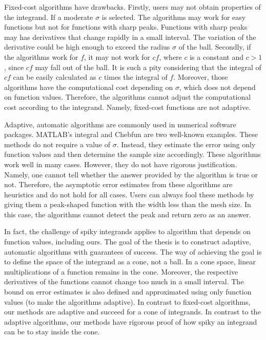 \documentclass{iitthesis}
\theoremstyle{definition}
\theoremstyle{remark}
\begin{document}
Fixed-cost algorithms have drawbacks. Firstly, users may not obtain properties of the integrand. If a moderate $\sigma$ is selected. The algorithms may work for easy functions but not for functions with sharp peaks. Functions with sharp peaks may has derivatives that change rapidly in a small interval. The variation of the derivative could be high enough to exceed the radius $\sigma$ of the ball. Secondly, if the algorithms work for $f$, it may not work for $cf$, where $c$ is a constant and $c>1$, since $cf$ may fall out of the ball. It is such a pity considering that the integral of $cf$ can be easily calculated as $c$ times the integral of $f$. Moreover, those algorithms have the computational cost depending on $\sigma$, which does not depend on function values. Therefore, the algorithms cannot adjust the computational cost according to the integrand. Namely, fixed-cost functions are not adaptive.

\label{secada}

Adaptive, automatic algorithms are commonly used in numerical software packages. MATLAB's integral and Chebfun are two well-known examples. These methods do not require a value of $\sigma$. Instead, they estimate the error using only function values and then determine the sample size accordingly. These algorithms work well in many cases. However, they do not have rigorous justification. Namely, one cannot tell whether the answer provided by the algorithm is true or not. Therefore, the asymptotic error estimates from these algorithms are heuristics and do not hold for all cases. Users can always fool these methods by giving them a peak-shaped function with the width less than the mesh size. In this case, the algorithms cannot detect the peak and return zero as an answer.

In fact, the challenge of spiky integrands applies to algorithm that depends on function values, including ours. The goal of the thesis is to construct adaptive, automatic algorithms with guarantees of success. The way of achieving the goal is to define the space of the integrand as a cone, not a ball. In a cone space, linear multiplications of a function remains in the cone. Moreover, the respective derivatives of the functions cannot change too much in a small interval. The bound on error estimates is also defined and approximated using only function values (to make the algorithms adaptive). In contrast to fixed-cost algorithms, our methods are adaptive and succeed for a cone of integrands. In contrast to the adaptive algorithms, our methods have rigorous proof of how spiky an integrand can be to stay inside the cone.
\end{document}
